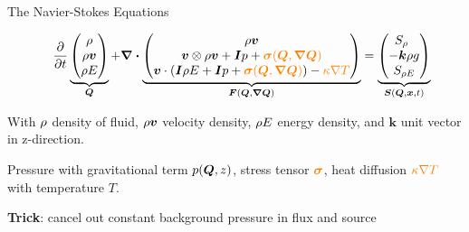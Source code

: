 \documentclass[aspectratio=169]{beamer}
\begin{document}
\begin{frame}{The Navier-Stokes Equations}
\newcommand{\diffCoeff}{\varepsilon}%
\newcommand{\hyperFluxDef}{
  \begin{pmatrix}
    \Qj \\
    \Qv  \otimes \Qj + \bm{I} \pressure  \\
    \Qv \cdot (\bm{I} \QE + \bm{I} \pressure)
  \end{pmatrix}
}%
\newcommand{\viscFluxDef}{
  \begin{pmatrix}
    0\\
     \stressT (\Q, \gradQ)  \\
     \Qv \cdot \stressT (\Q, \gradQ) - \kappa \gradient{T}
   \end{pmatrix}
}%

  \begin{equation}
 \label{eq:equation-set} 
\quad
  \pdv{}{t}
  \underbrace{
  \begin{pmatrix}
    \Qrho\\
    \Qj\\
    \QE
    \end{pmatrix}}_{\Q}
  +
  \divergence{\underbrace{
  \begin{pmatrix}
    \Qj \\
    \Qv  \otimes \Qj + \bm{I} \pressure + \textcolor{orange}{\stressT (\Q, \gradQ)}  \\
    \Qv \cdot \left(\bm{I} \QE + \bm{I} \pressure + \textcolor{orange}{\stressT (\Q, \gradQ)} \right) -
    \textcolor{orange}{\kappa \nabla T}
  \end{pmatrix}}}_{\flux(\Q, \gradQ)}
 =
  \underbrace{
  \begin{pmatrix}
    \source[\Qrho\phantom{\Qrho}]\\
    - \bm{k} \Qrho g\\
    \source[\QE]
    \end{pmatrix}}_{\source(\Q, \bm{x}, t)}
\end{equation}

With $\rho$ density of fluid, $\rho \bm{v}$ velocity density, $\rho E$ energy density, and $\bm{k}$ unit vector in z-direction.

Pressure with gravitational term $p(\bm{Q}, z)$,
stress tensor $\textcolor{orange}{\bm{\sigma}}$, heat diffusion $\textcolor{orange}{\kappa \nabla T}$ with temperature $T$.

\textbf{Trick}: cancel out constant background pressure in flux and source

\end{frame}
\end{document}
